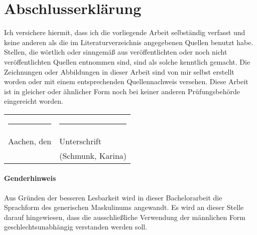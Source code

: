 \chapter*{Abschlusserklärung}
 \thispagestyle{empty}

Ich versichere hiermit, dass ich die vorliegende Arbeit selbständig verfasst und keine anderen als die im Literaturverzeichnis angegebenen Quellen benutzt habe.
Stellen, die wörtlich oder sinngemäß aus veröffentlichten oder noch nicht veröffentlichten Quellen entnommen sind, sind als solche kenntlich gemacht.
Die Zeichnungen oder Abbildungen in dieser Arbeit sind von mir selbst erstellt worden oder mit einem entsprechenden Quellennachweis versehen.
Diese Arbeit ist in gleicher oder ähnlicher Form noch bei keiner anderen Prüfungsbehörde eingereicht worden.
\\[3\normalbaselineskip]
\begin{tabular}{p{} l}
  \rule{\textwidth/3}{0.4pt}   &   \rule{\textwidth/3}{0.4pt} \\
  Aachen, den                  &   Unterschrift
  \\
                               &   (Schmunk, Karina)
\end{tabular}
\newpage
\subsubsection{Genderhinweis}
\normalsize{
Aus Gründen der besseren Lesbarkeit wird in dieser Bachelorarbeit die Sprachform des generischen Maskulinums  angewandt.  Es  wird  an  dieser  Stelle  darauf  hingewiesen,  dass  die  ausschließliche Verwendung der männlichen Form geschlechtsunabhängig verstanden werden soll.}